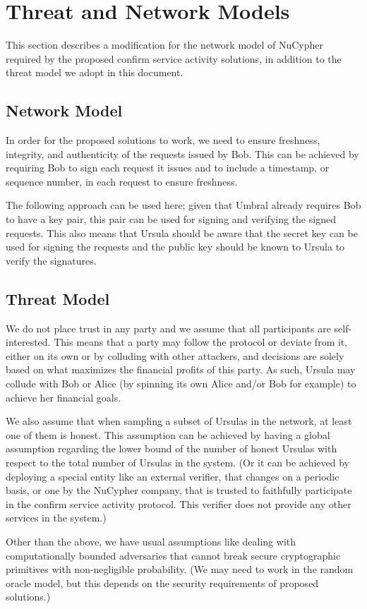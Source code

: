\section{Threat and Network Models}
\label{threat-network-model}
This section describes a modification for the network model of NuCypher 
required by the proposed confirm service activity solutions, in 
addition to the threat model we adopt in this document.


\subsection{Network Model}
In order for the proposed solutions to work, we need to ensure freshness, 
integrity, and authenticity of the requests issued by Bob. This can be achieved 
by requiring Bob to sign each request it issues and to include a timestamp, or 
sequence number, in each request to ensure freshness.


The following approach can be used here; given that Umbral already requires Bob to 
have a key pair, this pair can be used for signing and verifying the signed requests. 
This also means that Ursula should be aware that the secret key can be used for
signing the requests and the public 
key should be known to Ursula to verify the signatures. 


\subsection{Threat Model}
We do not place trust in any party and we assume that all participants are 
self-interested. This means that a party may 
follow the protocol or deviate from it, either on its own or by colluding 
with other attackers, and decisions are solely based on what maximizes the financial profits
of this party. As such, Ursula may collude with Bob or Alice (by spinning 
its own Alice and/or Bob for example) to achieve her financial goals. 


We also assume that when sampling a subset of Ursulas in the network, 
at least one of them is honest. This assumption can be achieved by 
having a global assumption regarding the lower bound of the number of 
honest Ursulas with respect to the total number of Ursulas in the system. 
(Or it can be achieved by deploying a special entity like an external verifier, 
that changes on a periodic basis, or one by the NuCypher company, that is
trusted to faithfully participate in the confirm 
service activity protocol. This verifier does not provide any other services 
in the system.)


Other than the above, we have usual assumptions like dealing with 
computationally bounded adversaries 
that cannot break secure cryptographic primitives with non-negligible probability. 
(We may need to work in the random oracle model, but this depends on the 
security requirements of proposed solutions.)
